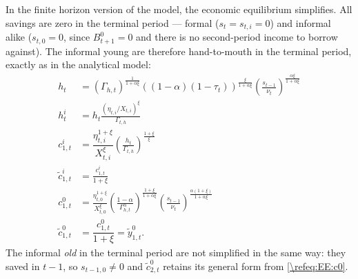 \documentclass[a4paper]{article}
\begin{document}
In the finite horizon version of the model, the economic equilibrium simplifies. All savings are zero in the terminal period --- formal ($s_t = s_{t,i} = 0$) and informal alike ($s_{t,0}=0$, since $B_{t+1}^0=0$ and there is no second-period income to borrow against). The informal young are therefore hand-to-mouth in the terminal period, exactly as in the analytical model:
\begin{subequations}\label{\refeq:TerminalEE}
\begin{align}
    h_t &= \left(\Gamma_{h,t}\right)^{\frac{1}{1+\alpha\xi}}\left((1-\alpha)(1-\tau_t)\right)^{\frac{\xi}{1+\alpha\xi}}\left(\frac{s_{t-1}}{\nu_t}\right)^{\frac{\alpha\xi}{1+\alpha\xi}} \\
    h_t^i &= h_t\frac{(\eta_{t,i}/X_{t,i})^{\xi}}{\Gamma_{t,h}} \\
    c_{1,t}^i &= \dfrac{\eta_{t,i}^{1+\xi}}{X_{t,i}^{\xi}}\left(\frac{h_t}{\Gamma_{t,h}}\right)^{\frac{1+\xi}{\xi}} \\
    \tilde{c}_{1,t}^i &= \frac{c_{1,t}^i}{1+\xi} \\
    c_{1,t}^0 &= \frac{\eta_{t,0}^{1+\xi}}{X_{t,0}^{\xi}}\left(\frac{1-\alpha}{\Gamma_{h,t}^{\alpha}}\right)^{\frac{1+\xi}{1+\alpha\xi}}\left(\frac{s_{t-1}}{\nu_t}\right)^{\frac{\alpha(1+\xi)}{1+\alpha\xi}} \\
    \tilde{c}_{1,t}^0 &= \dfrac{c_{1,t}^0}{1+\xi} = \tilde{y}_{1,t}^0.
\end{align}
\end{subequations}
The informal \emph{old} in the terminal period are not simplified in the same way: they saved in $t-1$, so $s_{t-1,0}\neq 0$ and $\tilde{c}_{2,t}^0$ retains its general form from \eqref{\refeq:EE:c0}.
\end{document}

